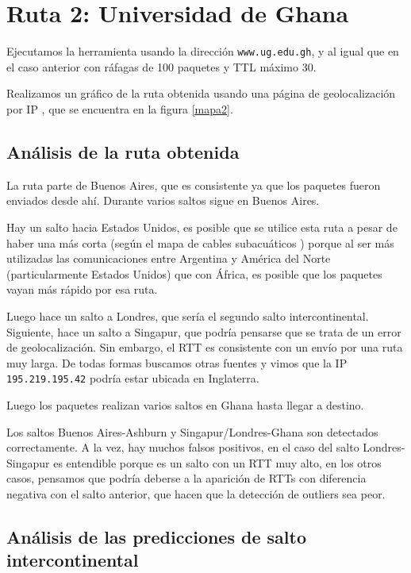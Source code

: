 \section{Ruta 2: Universidad de Ghana}

Ejecutamos la herramienta usando la dirección \texttt{www.ug.edu.gh}, y al igual que en el caso anterior con ráfagas de 100 paquetes y TTL máximo 30.

Realizamos un gráfico de la ruta obtenida usando una página de geolocalización por IP \cite{ip2location}, que se encuentra en la figura \ref{mapa2}.

\subsection{Análisis de la ruta obtenida}

La ruta parte de Buenos Aires, que es consistente ya que los paquetes fueron enviados desde ahí. Durante varios saltos sigue en Buenos Aires.

Hay un salto hacia Estados Unidos, es posible que se utilice esta ruta a pesar de haber una más corta (según el mapa de cables subacuáticos \cite{cables}) porque al ser más utilizadas las comunicaciones entre Argentina y América del Norte (particularmente Estados Unidos) que con África, es posible que los paquetes vayan más rápido por esa ruta.

Luego hace un salto a Londres, que sería el segundo salto intercontinental. Siguiente, hace un salto a Singapur, que podría pensarse que se trata de un error de geolocalización. Sin embargo, el RTT es consistente con un envío por una ruta muy larga. De todas formas buscamos otras fuentes y vimos que la IP \texttt{195.219.195.42} podría estar ubicada en Inglaterra.

Luego los paquetes realizan varios saltos en Ghana hasta llegar a destino. 

Los saltos Buenos Aires-Ashburn y Singapur/Londres-Ghana son detectados correctamente. A la vez, hay muchos falsos positivos, en el caso del salto Londres-Singapur es entendible porque es un salto con un RTT muy alto, en los otros casos, pensamos que podría deberse a la aparición de RTTs con diferencia negativa con el salto anterior, que hacen que la detección de outliers sea peor.

\subsection{Análisis de las predicciones de salto intercontinental}


